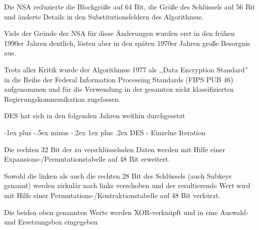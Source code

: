 \documentclass[a4paper]{article}
\makeatletter
\renewcommand{\subsubsection}{\@startsection{subsubsection}{3}{0mm}%
 {-1ex plus -.5ex minus -.2ex}%
 {1ex plus .2ex}%
 {\normalfont\small\bfseries}}
\makeatother
\begin{document}
\begin{multicols}{3}
\begin{itemize*}
            \begin{itemize*}
                  \item Die NSA reduzierte die Blockgröße auf 64 Bit, die Größe des Schlüssels auf 56 Bit und änderte Details in den Substitutionsfeldern des Algorithmus.
                  \item Viele der Gründe der NSA für diese Änderungen wurden erst in den frühen 1990er Jahren deutlich, lösten aber in den späten 1970er Jahren große Besorgnis aus.
            \end{itemize*}
            \item
            Trotz aller Kritik wurde der Algorithmus 1977 als ,,Data Encryption
            Standard'' in die Reihe der Federal Information Processing Standards
            (FIPS PUB 46) aufgenommen und für die Verwendung in der gesamten nicht
            klassifizierten Regierungskommunikation zugelassen.
            \item
            DES hat sich in den folgenden Jahren weithin durchgesetzt
      \end{itemize*}




      \subsubsection{DES - Einzelne
            Iteration}

      \begin{itemize*}
            \item
            Die rechten 32 Bit der zu verschlüsselnden Daten werden mit Hilfe
            einer Expansions-/Permutationstabelle auf 48 Bit erweitert.
            \item
            Sowohl die linken als auch die rechten 28 Bit des Schlüssels (auch
            Subkeys genannt) werden zirkulär nach links verschoben und der
            resultierende Wert wird mit Hilfe einer
            Permutations-/Kontraktionstabelle auf 48 Bit verkürzt.
            \item
            Die beiden oben genannten Werte werden XOR-verknüpft und in eine
            Auswahl- und Ersetzungsbox eingegeben


\end{itemize*}
\end{multicols}
\end{document}

